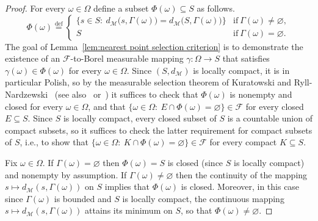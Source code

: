\documentclass[11pt,reqno]{amsart}
\theoremstyle{remark}
\newcommand{\MM}{\mathcal{M}}
\renewcommand{\subset}{\subseteq}
\newcommand{\eqdef}{\stackrel{\mathrm{def}}{=}}
\renewcommand{\emptyset}{\varnothing}
\renewcommand{\1}{\mathbf 1}
\begin{document}
\begin{proof} For every $\omega\in \Omega$ define a subset $\Phi(\omega)\subset S$ as follows.
\begin{equation*}\label{eq:def Psi to select}
\Phi(\omega)\eqdef \left\{\begin{array}{cl}
\Big\{s\in S:\ d_\MM\big(s,\Gamma(\omega)\big)=d_\MM\big(S,\Gamma(\omega)\big)\Big\}&\mathrm{if}\ \Gamma(\omega)\neq\emptyset,\\
S&\mathrm{if}\ \Gamma(\omega)=\emptyset.
\end{array}\right.
\end{equation*}
The goal of Lemma~\ref{lem:nearest point selection criterion} is to demonstrate  the existence of an $\mathscr{F}$-to-Borel measurable mapping $\gamma:\Omega\to S$ that satisfies $\gamma(\omega)\in \Phi(\omega)$ for every $\omega\in \Omega$.  Since $(S,d_\MM)$ is locally compact, it is in particular Polish, so by the measurable selection theorem of Kuratowski and Ryll-Nardzewski~\cite{KR65} (see also~\cite{Wag77} or~\cite[Chapter~5.2]{Sri98}) it suffices to check that $\Phi(\omega)$ is nonempty and closed for every $\omega\in \Omega$, and  that $\{\omega\in \Omega:\ E\cap \Phi(\omega)= \emptyset\}\in \mathscr{F}$ for every closed  $E\subset S$. Since $S$ is locally compact, every closed subset of $S$ is a countable union of compact subsets, so it suffices to check the latter requirement for compact subsets of $S$, i.e., to show that $\{\omega\in \Omega:\ K\cap \Phi(\omega)= \emptyset\}\in \mathscr{F}$ for every compact $K\subset S$.

Fix $\omega\in \Omega$. If $\Gamma(\omega)=\emptyset$ then $\Phi(\omega)=S$ is closed (since $S$ is locally compact) and nonempty by assumption. If $\Gamma(\omega)\neq \emptyset $ then the continuity of the mapping $s\mapsto d_\MM(s,\Gamma(\omega))$ on $S$ implies that $\Phi(\omega)$ is closed. Moreover, in this case since $\Gamma(\omega)$ is bounded and $S$ is locally compact, the  continuous  mapping $s\mapsto d_\MM(s,\Gamma(\omega))$ attains its minimum on $S$, so that $\Phi(\omega)\neq \emptyset$.


\end{proof}
\end{document}
